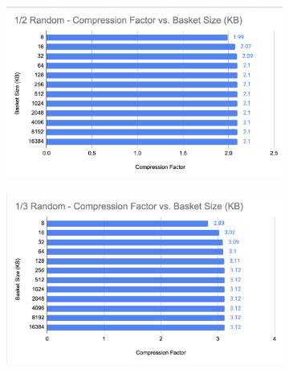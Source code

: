 \begin{figure}[h]
    \centering
    \vspace{20px}
    \begin{subfigure}{.5\textwidth}
        \centering
        \includegraphics[width=\textwidth]{content/toymodel_content/3.28/1_of_2.png}
        \label{fig:toymodel_328_compF_vs_basketsize_subA}
      \end{subfigure}%
      \begin{subfigure}{.5\textwidth}
        \centering
        \includegraphics[width=\textwidth]{content/toymodel_content/3.28/1_of_3.png}
        \label{fig:toymodel_328_compF_vs_basketsize_subB}
      \end{subfigure}%
      \linebreak
      \begin{subfigure}{.5\textwidth}
        \centering

\end{subfigure}
\end{figure}
